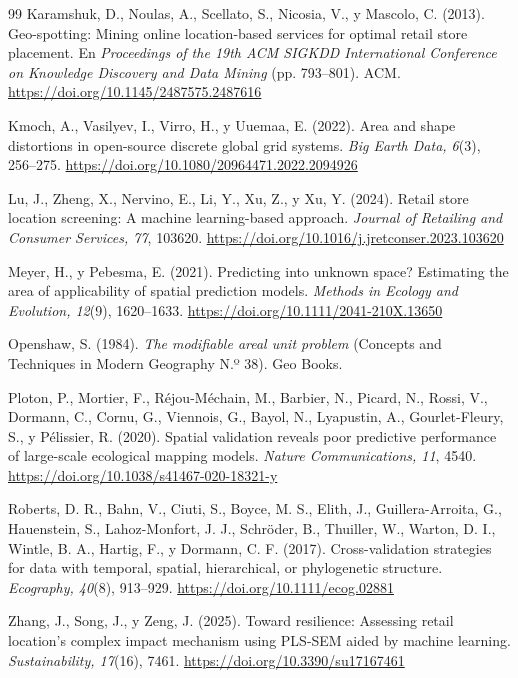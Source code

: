 \documentclass[10pt,letterpaper,twocolumn]{article}
\begin{document}
\begin{thebibliography}{99}
 Karamshuk, D., Noulas, A., Scellato, S., Nicosia, V., y Mascolo, C. (2013). Geo-spotting: Mining online location-based services for optimal retail store placement. En \textit{Proceedings of the 19th ACM SIGKDD International Conference on Knowledge Discovery and Data Mining} (pp. 793--801). ACM. \url{https://doi.org/10.1145/2487575.2487616}

 Kmoch, A., Vasilyev, I., Virro, H., y Uuemaa, E. (2022). Area and shape distortions in open-source discrete global grid systems. \textit{Big Earth Data, 6}(3), 256--275. \url{https://doi.org/10.1080/20964471.2022.2094926}

 Lu, J., Zheng, X., Nervino, E., Li, Y., Xu, Z., y Xu, Y. (2024). Retail store location screening: A machine learning-based approach. \textit{Journal of Retailing and Consumer Services, 77}, 103620. \url{https://doi.org/10.1016/j.jretconser.2023.103620}

 Meyer, H., y Pebesma, E. (2021). Predicting into unknown space? Estimating the area of applicability of spatial prediction models. \textit{Methods in Ecology and Evolution, 12}(9), 1620--1633. \url{https://doi.org/10.1111/2041-210X.13650}

 Openshaw, S. (1984). \textit{The modifiable areal unit problem} (Concepts and Techniques in Modern Geography N.º 38). Geo Books.

 Ploton, P., Mortier, F., Réjou-Méchain, M., Barbier, N., Picard, N., Rossi, V., Dormann, C., Cornu, G., Viennois, G., Bayol, N., Lyapustin, A., Gourlet-Fleury, S., y Pélissier, R. (2020). Spatial validation reveals poor predictive performance of large-scale ecological mapping models. \textit{Nature Communications, 11}, 4540. \url{https://doi.org/10.1038/s41467-020-18321-y}

 Roberts, D. R., Bahn, V., Ciuti, S., Boyce, M. S., Elith, J., Guillera-Arroita, G., Hauenstein, S., Lahoz-Monfort, J. J., Schröder, B., Thuiller, W., Warton, D. I., Wintle, B. A., Hartig, F., y Dormann, C. F. (2017). Cross-validation strategies for data with temporal, spatial, hierarchical, or phylogenetic structure. \textit{Ecography, 40}(8), 913--929. \url{https://doi.org/10.1111/ecog.02881}

 Zhang, J., Song, J., y Zeng, J. (2025). Toward resilience: Assessing retail location's complex impact mechanism using PLS-SEM aided by machine learning. \textit{Sustainability, 17}(16), 7461. \url{https://doi.org/10.3390/su17167461}


\end{thebibliography}
\end{document}
